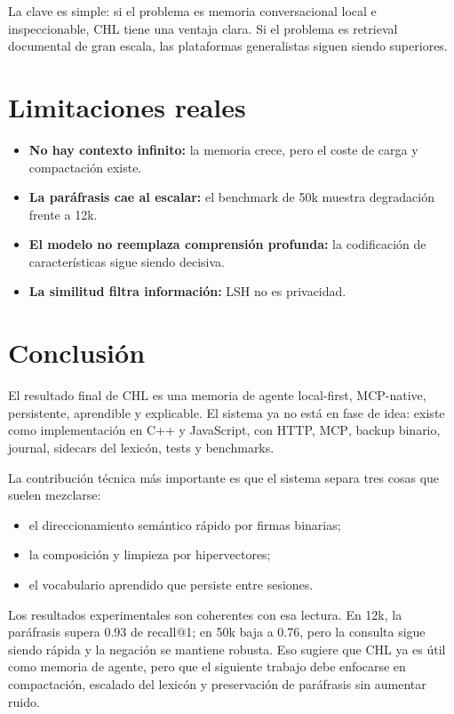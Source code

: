 \documentclass[11pt]{article}
\newcommand{\CHL}{\textsc{CHL}}
\newcommand{\LSH}{\textsc{LSH}}
\newcommand{\MCP}{\textsc{MCP}}
\begin{document}
La clave es simple: si el problema es memoria conversacional local e inspeccionable, \CHL{} tiene una ventaja clara. Si el problema es retrieval documental de gran escala, las plataformas generalistas siguen siendo superiores.

\section{Limitaciones reales}

\begin{itemize}
  \item \textbf{No hay contexto infinito:} la memoria crece, pero el coste de carga y compactación existe.
  \item \textbf{La paráfrasis cae al escalar:} el benchmark de 50k muestra degradación frente a 12k.
  \item \textbf{El modelo no reemplaza comprensión profunda:} la codificación de características sigue siendo decisiva.
  \item \textbf{La similitud filtra información:} \LSH{} no es privacidad.
\end{itemize}

\section{Conclusión}

El resultado final de \CHL{} es una memoria de agente local-first, \MCP{}-native, persistente, aprendible y explicable. El sistema ya no está en fase de idea: existe como implementación en C++ y JavaScript, con HTTP, \MCP{}, backup binario, journal, sidecars del lexicón, tests y benchmarks.

La contribución técnica más importante es que el sistema separa tres cosas que suelen mezclarse:
\begin{itemize}
  \item el direccionamiento semántico rápido por firmas binarias;
  \item la composición y limpieza por hipervectores;
  \item el vocabulario aprendido que persiste entre sesiones.
\end{itemize}

Los resultados experimentales son coherentes con esa lectura. En 12k, la paráfrasis supera 0.93 de recall@1; en 50k baja a 0.76, pero la consulta sigue siendo rápida y la negación se mantiene robusta. Eso sugiere que \CHL{} ya es útil como memoria de agente, pero que el siguiente trabajo debe enfocarse en compactación, escalado del lexicón y preservación de paráfrasis sin aumentar ruido.
\end{document}
